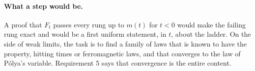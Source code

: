 \paragraph{What a step would be.} A proof that $F_t$ passes every rung up to $m(t)$ for $t<0$ would make the failing rung exact and would be a first uniform statement, in $t$, about the ladder. On the side of weak limits, the task is to find a family of laws that is known to have the property, hitting times or ferromagnetic laws, and that converges to the law of Pólya's variable. Requirement 5 says that convergence is the entire content.
